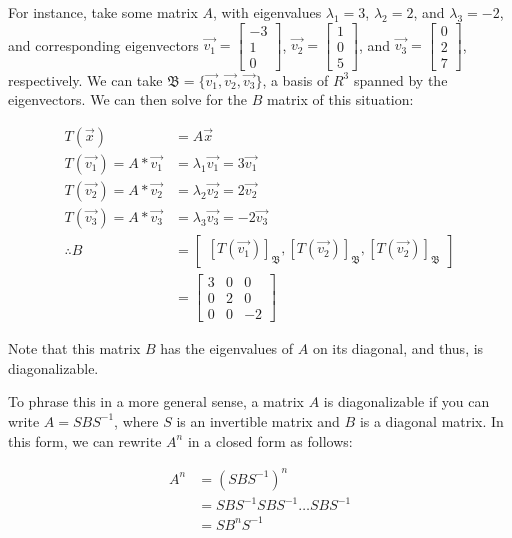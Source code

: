 \documentclass[12pt]{article}
\begin{document}
{{For instance, take some matrix $A$, with eigenvalues $\lambda_1 = 3$, $\lambda_2 = 2$, and $\lambda_3 = -2$, and corresponding eigenvectors $\vec{v_1} = \begin{bmatrix}
    -3\\
    1\\
    0\end{bmatrix}$, $\vec{v_2}=\begin{bmatrix}
    1\\
    0\\
    5\end{bmatrix}$, and $\vec{v_3}=\begin{bmatrix}
    0\\
    2\\
    7\end{bmatrix}$, respectively. We can take $\mathfrak{B} = \{\vec{v_1}, \vec{v_2}, \vec{v_3}\}$, a basis of $R^3$ spanned by the eigenvectors. We can then solve for the $B$ matrix of this situation:

\begin{align*}
    T(\vec{x}) &= A\vec{x}\\
    T(\vec{v_1}) = A * \vec{v_1} &= \lambda_1\vec{v_1} = 3 \vec{v_1}\\
    T(\vec{v_2}) = A * \vec{v_2} &= \lambda_2\vec{v_2} = 2 \vec{v_2}\\
    T(\vec{v_3}) = A * \vec{v_3} &= \lambda_3\vec{v_3} = -2 \vec{v_3}\\
    \therefore B &= \begin{bmatrix}
        [T(\vec{v_1})]_{\mathfrak{B}}, [T(\vec{v_2})]_{\mathfrak{B}}, [T(\vec{v_2})]_{\mathfrak{B}}
    \end{bmatrix}\\
    &= \begin{bmatrix}
        3 & 0 & 0\\
        0 & 2 & 0\\
        0 & 0 & -2
    \end{bmatrix}
\end{align*}

Note that this matrix $B$ has the eigenvalues of $A$ on its diagonal, and thus, is diagonalizable.

To phrase this in a more general sense, a matrix $A$ is diagonalizable if you can write $A = SBS^{-1}$, where $S$ is an invertible matrix and $B$ is a diagonal matrix. In this form, we can rewrite $A^n$ in a closed form as follows:

\begin{align*}
    A^n &= (SBS^{-1})^n\\
    &= SBS^{-1}SBS^{-1} \dots SBS^{-1}\\
    &= SB^{n}S^{-1}\\
\end{align*}

}}
\end{document}
